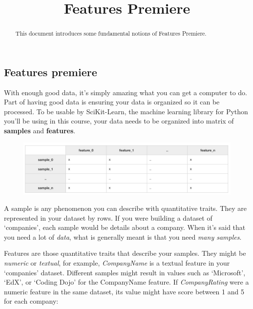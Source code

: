 \documentclass{article}
\begin{document}
\title{Features Premiere}

\maketitle

\begin{abstract}
This document introduces some fundamental notions of Features Premiere.
\end{abstract}

\subsection{Features premiere}
\par With enough good data, it's simply amazing what you can get a computer to do. Part of having good data is ensuring your data is organized so it can be processed. To be usable by SciKit-Learn, the machine learning library for Python you'll be using in this course, your data needs to be organized into matrix of {\bf{samples}} and {\bf{features}}.

\begin{figure}[H]
\centering
\includegraphics[width=\linewidth]{pic/features-premiere-1.png}
\end{figure}

A sample is any phenomenon you can describe with quantitative traits. They are represented in your dataset by rows. If you were building a dataset of `companies', each sample would be details about a company. When it's said that you need a lot of {\it{data}}, what is generally meant is that you need {\it{many samples}}.

Features are those quantitative traits that describe your samples. They might be {\it{numeric}} or {\it{textual}}, for example, {\it{CompanyName}} is a textual feature in your `companies' dataset. Different samples might result in values such as `Microsoft', `EdX', or `Coding Dojo' for the CompanyName feature. If {\it{CompanyRating}} were a numeric feature in the same dataset, its value might have score between 1 and 5 for each company:
\end{document}
